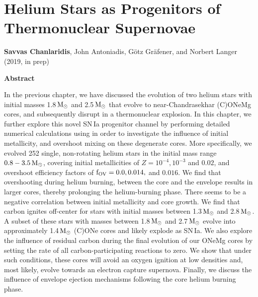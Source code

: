 \documentclass[../../main/thesis_msc.tex]{subfiles}
\begin{document}
\chapter{Helium Stars as Progenitors of Thermonuclear Supernovae}\label{ch:paperII}

\begin{center}
\textbf{Savvas Chanlaridis}, John Antoniadis, G\"otz Gr\"afener, and Norbert Langer (2019, in prep)
\newline
\end{center}


\begin{center}
\textbf{\large Abstract}
\end{center}

In the previous chapter, we have discussed the evolution of two helium stars with initial masses 1.8\,$\rm M_{\odot}$ and 2.5\,$\rm M_{\odot}$ that evolve to near-Chandrasekhar (C)ONeMg cores, and subsequently disrupt in a thermonuclear explosion. In this chapter, we further explore this novel SN\,Ia progenitor channel by performing detailed numerical calculations using \mesa in order to investigate the influence of initial metallicity, and overshoot mixing on these degenerate cores. 
More specifically, we evolved 252 single, non-rotating helium stars  in the initial mass range $\rm 0.8-3.5\, M_{\odot}$, covering initial metallicities of $Z=10^{-4},10^{-3}$ and $0.02$, and overshoot efficiency factors of $\rm f_{OV} = 0.0,0.014,$ and $0.016$. 
We find that overshooting during helium burning, between the core and the envelope results in larger cores, thereby prolonging the helium-burning phase. 
There seems to be a negative correlation between initial metallicity and core growth. We find that carbon ignites off-center for stars with initial masses between 1.3\,$\rm M_{\odot}$ and 2.8\,$\rm M_{\odot}$. A subset of these stars with masses between 1.8\,$\rm M_{\odot}$ and 2.7\,$\rm M_{\odot}$ evolve into approximately 1.4\,$\rm M_{\odot}$ (C)ONe cores and likely explode as SN\,Ia. 
We also explore the influence of residual carbon during the final evolution of our ONeMg cores by setting the rate of all carbon-participating reactions to zero. We  show that under such conditions,  these cores will avoid an oxygen ignition at low densities and, most likely, evolve towards an electron capture supernova. Finally, we discuss the influence of  envelope ejection mechanisms following the core helium burning phase.


{\hypersetup{linkcolor=black, pdfborder=0 0 1}
	\minitoc
	\newpage
	}
\end{document}
